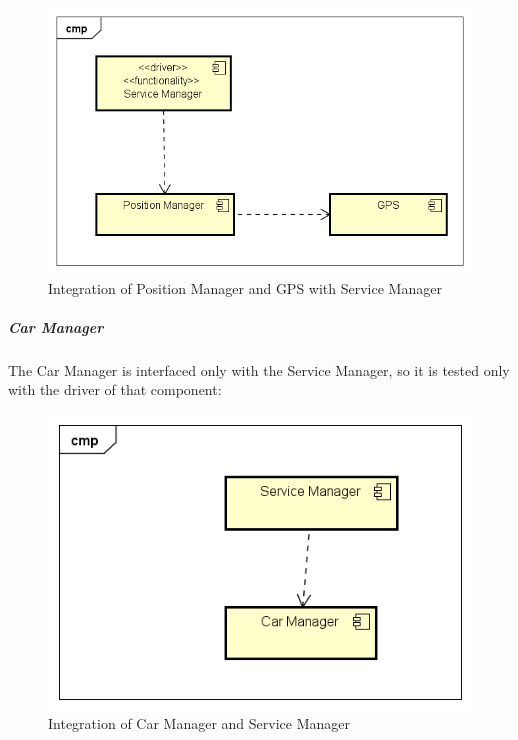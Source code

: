 \begin{figure}[H]	
	\centering
	\includegraphics[width=\textwidth]{img/PosMan_SrvMan_int}
	\caption{Integration of Position Manager and GPS with Service Manager}
\end{figure}

\subparagraph{Car Manager}
The Car Manager is interfaced only with the Service Manager, so it is tested only with the driver of that component:

\begin{figure}[H]	
	\centering
	\includegraphics[width=\textwidth]{img/CarMan_SrvMan_int}
	\caption{Integration of Car Manager and Service Manager}
\end{figure}

